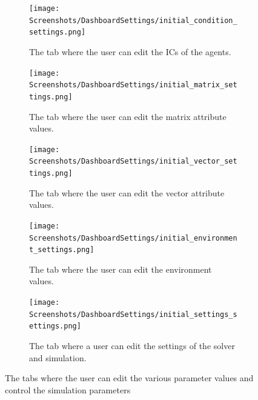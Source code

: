 \begin{figure}[h!]
    \centering
    \begin{subfigure}{0.49\linewidth}
        \centering
        \captionsetup{width=1\linewidth}
        \texttt{[image: Screenshots/DashboardSettings/initial\_condition\_settings.png]}
        \caption{
            The tab where the user can edit the ICs of the agents.
        }
        \label{fig:ss:ds:initial_condition}
    \end{subfigure}
    \hfill
    \begin{subfigure}{0.49\linewidth}
        \centering
        \captionsetup{width=1\linewidth}
        \texttt{[image: Screenshots/DashboardSettings/initial\_matrix\_settings.png]}
        \caption{
            The tab where the user can edit the matrix attribute values. 
        }
        \label{fig:ss:ds:matrix}
    \end{subfigure}
    \hfill
    \begin{subfigure}{0.49\linewidth}
        \centering
        \captionsetup{width=1\linewidth}
        \texttt{[image: Screenshots/DashboardSettings/initial\_vector\_settings.png]}
        \caption{
            The tab where the user can edit the vector attribute values.
        }
        \label{fig:ss:ds:vector}
    \end{subfigure}
    \hfill
    \begin{subfigure}{0.49\linewidth}
        \centering
        \captionsetup{width=1\linewidth}
        \texttt{[image: Screenshots/DashboardSettings/initial\_environment\_settings.png]}
        \caption{
            The tab where the user can edit the environment values. 
        }
        \label{fig:ss:ds:environment}
    \end{subfigure}
    \hfill
    \begin{subfigure}{0.49\linewidth}
        \centering
        \captionsetup{width=1\linewidth}
        \texttt{[image: Screenshots/DashboardSettings/initial\_settings\_settings.png]}
        \caption{
            The tab where a user can edit the settings of the solver and simulation. 
        }
        \label{fig:ss:ds:settings}
    \end{subfigure}
    \caption{The tabs where the user can edit the various parameter values and control the simulation parameters}
 \end{figure}

